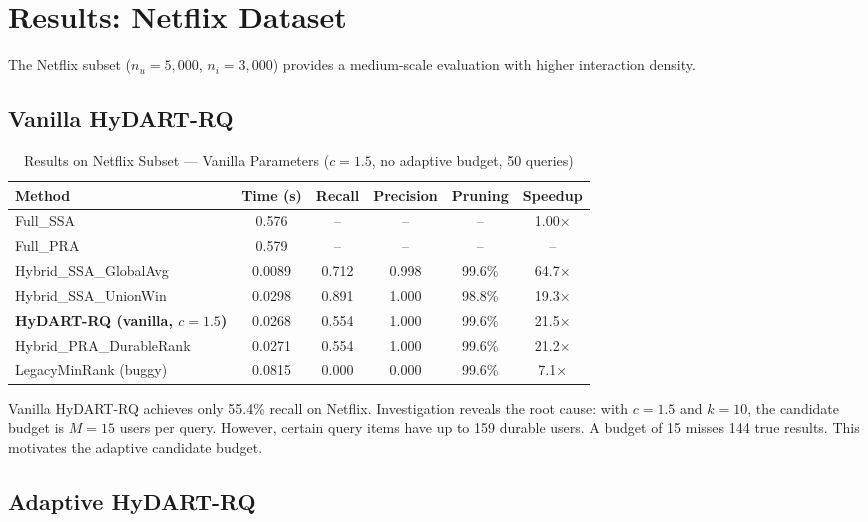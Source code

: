\section{Results: Netflix Dataset}

The Netflix subset ($n_u = 5{,}000$, $n_i = 3{,}000$) provides a medium-scale evaluation with higher interaction density.

\subsection{Vanilla HyDART-RQ}

\begin{table}[htbp]
\centering
\caption{Results on Netflix Subset --- Vanilla Parameters ($c=1.5$, no adaptive budget, 50 queries)}
\label{tab:netflix_vanilla}
\begin{tabular}{lccccc}
\toprule
\textbf{Method} & \textbf{Time (s)} & \textbf{Recall} & \textbf{Precision} & \textbf{Pruning} & \textbf{Speedup} \\
\midrule
Full\_SSA             & 0.576  & --    & --    & --     & 1.00$\times$ \\
Full\_PRA             & 0.579  & --    & --    & --     & -- \\
Hybrid\_SSA\_GlobalAvg   & 0.0089 & 0.712 & 0.998 & 99.6\% & 64.7$\times$ \\
Hybrid\_SSA\_UnionWin    & 0.0298 & 0.891 & 1.000 & 98.8\% & 19.3$\times$ \\
\textbf{HyDART-RQ (vanilla, $c=1.5$)} & 0.0268 & 0.554 & 1.000 & 99.6\% & 21.5$\times$ \\
Hybrid\_PRA\_DurableRank & 0.0271 & 0.554 & 1.000 & 99.6\% & 21.2$\times$ \\
LegacyMinRank (buggy) & 0.0815 & 0.000 & 0.000 & 99.6\% & 7.1$\times$ \\
\bottomrule
\end{tabular}
\end{table}

Vanilla HyDART-RQ achieves only 55.4\% recall on Netflix. Investigation reveals the root cause: with $c = 1.5$ and $k = 10$, the candidate budget is $M = 15$ users per query. However, certain query items have up to 159 durable users. A budget of 15 misses 144 true results. This motivates the adaptive candidate budget.

\subsection{Adaptive HyDART-RQ}

